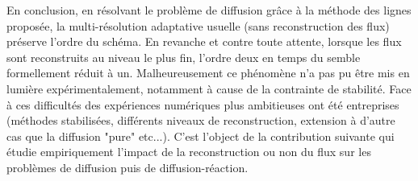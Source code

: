 En conclusion, en résolvant le problème de diffusion grâce à la méthode des lignes proposée, la multi-résolution adaptative usuelle (sans reconstruction des flux)
préserve l'ordre du schéma. En revanche et contre toute attente, lorsque les flux sont reconstruits au niveau le plus fin, l'ordre deux en temps du semble formellement réduit à un.
Malheureusement ce phénomène n'a pas pu être mis en lumière expérimentalement, notamment à cause de la contrainte de stabilité.
Face à ces difficultés des expériences numériques plus ambitieuses ont été entreprises 
(méthodes stabilisées, différents niveaux de reconstruction, extension à d'autre cas que la diffusion "pure" etc...).
C'est l'object de la contribution suivante qui étudie empiriquement l'impact de la reconstruction ou non du flux sur les problèmes de diffusion puis de diffusion-réaction.